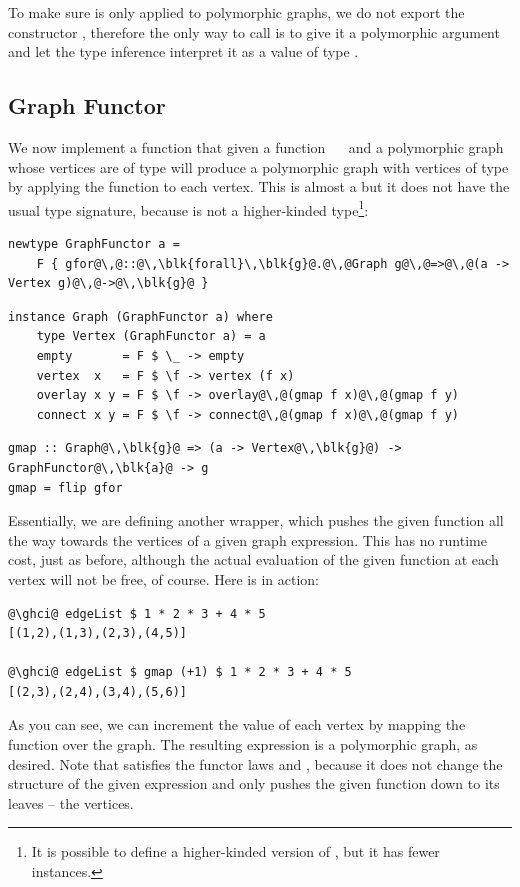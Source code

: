 To make sure  is only applied to polymorphic graphs, we do not export
the constructor , therefore the only way to call  is to give it a
polymorphic argument and let the type inference interpret it as a value of type
.

\subsection{Graph Functor}\label{sub-functor}

We now implement a function  that given a function ~\hs{->}~
and a polymorphic graph whose vertices are of type  will produce a
polymorphic graph with vertices of type  by applying the function
to each vertex. This is almost a  but it does not have the usual
type signature, because  is not a higher-kinded type\footnote{It is
possible to define a higher-kinded version of , but it has
fewer instances.}:

\vspace{2mm}
\begin{verbatim}
newtype GraphFunctor a =
    F { gfor@\,@::@\,\blk{forall}\,\blk{g}@.@\,@Graph g@\,@=>@\,@(a -> Vertex g)@\,@->@\,\blk{g}@ }
\end{verbatim}
\vspace{1mm}
\begin{verbatim}
instance Graph (GraphFunctor a) where
    type Vertex (GraphFunctor a) = a
    empty       = F $ \_ -> empty
    vertex  x   = F $ \f -> vertex (f x)
    overlay x y = F $ \f -> overlay@\,@(gmap f x)@\,@(gmap f y)
    connect x y = F $ \f -> connect@\,@(gmap f x)@\,@(gmap f y)
\end{verbatim}
\vspace{1mm}
\begin{verbatim}
gmap :: Graph@\,\blk{g}@ => (a -> Vertex@\,\blk{g}@) -> GraphFunctor@\,\blk{a}@ -> g
gmap = flip gfor
\end{verbatim}

Essentially, we are defining another  wrapper, which pushes the
given function all the way towards the vertices of a given graph expression.
This has no runtime cost,
just as before, although the actual evaluation of the given function at each
vertex will not be free, of course. Here is  in action:

\begin{verbatim}
@\ghci@ edgeList $ 1 * 2 * 3 + 4 * 5
[(1,2),(1,3),(2,3),(4,5)]

@\ghci@ edgeList $ gmap (+1) $ 1 * 2 * 3 + 4 * 5
[(2,3),(2,4),(3,4),(5,6)]
\end{verbatim}
\vspace{-1mm}
As you can see, we can increment the value of each vertex by mapping the function
 over the graph. The resulting expression is a polymorphic graph, as desired.
Note that  satisfies the functor laws
 and , because
it does not change the structure of the given expression and only pushes
the given function down to its leaves -- the vertices.

